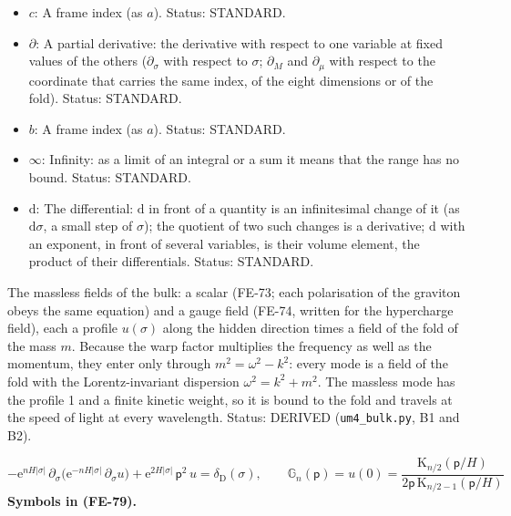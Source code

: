 \documentclass[
  10pt,
]{article}
\begin{document}
\begin{itemize}
  \(\eta_{ab}\): The flat metric of the frame,
  \(\eta = \mathrm{diag}(1, 1, 1, 1, -1, -1, -1, -1)\) (eta4488 of
  4+4.nb); \(\eta^{ab}\) is its inverse (the same matrix). Unit:
  dimensionless. Status: AUTHOR.
\item
  \(c\): A frame index (as \(a\)). Status: STANDARD.
\item
  \(\partial\): A partial derivative: the derivative with respect to one
  variable at fixed values of the others (\(\partial_\sigma\) with
  respect to \(\sigma\); \(\partial_M\) and \(\partial_\mu\) with
  respect to the coordinate that carries the same index, of the eight
  dimensions or of the fold). Status: STANDARD.
\item
  \(b\): A frame index (as \(a\)). Status: STANDARD.
\item
  \(\infty\): Infinity: as a limit of an integral or a sum it means that
  the range has no bound. Status: STANDARD.
\item
  \(\mathrm{d}\): The differential: \(\mathrm{d}\) in front of a
  quantity is an infinitesimal change of it (as \(\mathrm{d}\sigma\), a
  small step of \(\sigma\)); the quotient of two such changes is a
  derivative; \(\mathrm{d}\) with an exponent, in front of several
  variables, is their volume element, the product of their
  differentials. Status: STANDARD.
\end{itemize}

The massless fields of the bulk: a scalar (FE-73; each polarisation of
the graviton obeys the same equation) and a gauge field (FE-74, written
for the hypercharge field), each a profile \(u(\sigma)\) along the
hidden direction times a field of the fold of the mass \(m\). Because
the warp factor multiplies the frequency as well as the momentum, they
enter only through \(m^2 = \omega^2 - k^2\): every mode is a field of
the fold with the Lorentz-invariant dispersion \(\omega^2 = k^2 + m^2\).
The massless mode has the profile 1 and a finite kinetic weight, so it
is bound to the fold and travels at the speed of light at every
wavelength. Status: DERIVED (\texttt{um4\_bulk.py}, B1 and B2).

\[
-\mathrm{e}^{nH\lvert\sigma\rvert}\,\partial_\sigma\big(\mathrm{e}^{-nH\lvert\sigma\rvert}\,\partial_\sigma u\big)
 + \mathrm{e}^{2H\lvert\sigma\rvert}\,\mathsf{p}^2\,u = \delta_{\mathrm{D}}(\sigma),\qquad
\mathbb{G}_n(\mathsf{p}) = u(0) = \frac{\mathrm{K}_{n/2}(\mathsf{p}/H)}{2\mathsf{p}\,\mathrm{K}_{n/2-1}(\mathsf{p}/H)} \tag{FE-79}
\] \textbf{Symbols in (FE-79).}
\end{document}
